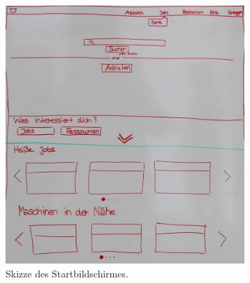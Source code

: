\begin{figure}
    \centering
    \begin{subfigure}[b]{0.45\textwidth}
		\includegraphics[width=\textwidth]{99_IMG/03_Umsetzung/homeWireframe_5.jpg}
		\caption{Skizze des Startbildschirmes.}
		\label{fig:homeWireframe}
    \end{subfigure}
    ~ %
    \begin{subfigure}[b]{0.45\textwidth}

\end{subfigure}
\end{figure}
